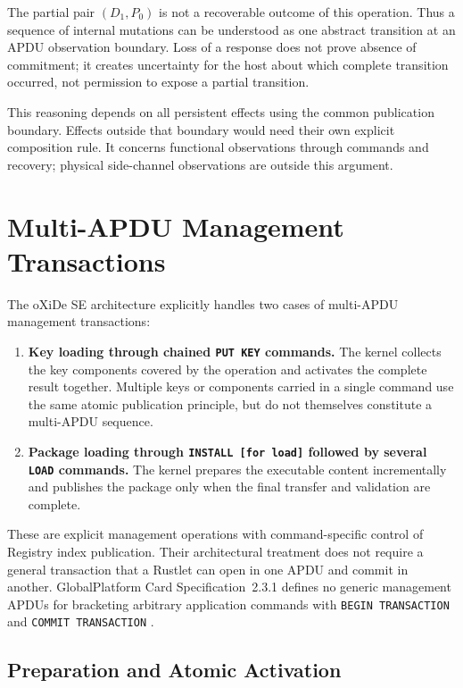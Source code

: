 The partial pair $(D_1,P_0)$ is not a recoverable outcome of this operation.
Thus a sequence of internal mutations can be understood as one abstract
transition at an APDU observation boundary. Loss of a response does not prove
absence of commitment; it creates uncertainty for the host about which
complete transition occurred, not permission to expose a partial transition.

This reasoning depends on all persistent effects using the common publication
boundary. Effects outside that boundary would need their own explicit
composition rule. It concerns functional observations through commands and
recovery; physical side-channel observations are outside this argument.

\section{Multi-APDU Management Transactions}
\label{sec:registry-multi-apdu}

The oXiDe SE architecture explicitly handles two cases of multi-APDU
management transactions:
\begin{enumerate}
\item \textbf{Key loading through chained \texttt{PUT KEY} commands.}
  The kernel collects the key components covered by the operation and
  activates the complete result together. Multiple keys or components carried
  in a single command use the same atomic publication principle, but do not
  themselves constitute a multi-APDU sequence.
\item \textbf{Package loading through \texttt{INSTALL [for load]} followed by
  several \texttt{LOAD} commands.} The kernel prepares the executable content
  incrementally and publishes the package only when the final transfer and
  validation are complete.
\end{enumerate}

These are explicit management operations with command-specific control of
Registry index publication. Their architectural treatment does not require a
general transaction that a Rustlet can open in one APDU and commit in another.
GlobalPlatform Card Specification~2.3.1 defines no generic management APDUs
for bracketing arbitrary application commands with \texttt{BEGIN TRANSACTION}
and \texttt{COMMIT TRANSACTION} .

\subsection{Preparation and Atomic Activation}

